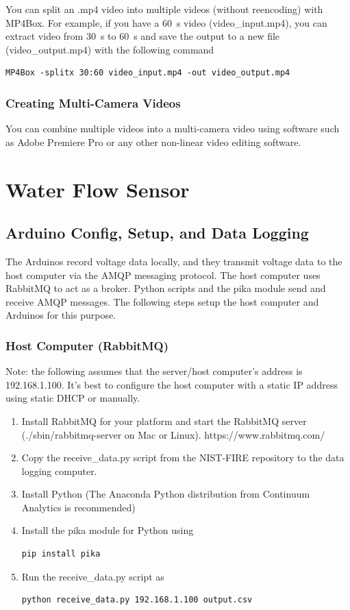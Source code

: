 \documentclass[11pt,oneside]{book}
\begin{document}
You can split an .mp4 video into multiple videos (without reencoding) with MP4Box. For example, if you have a 60~s video (video\_input.mp4), you can extract video from 30~s to 60~s and save the output to a new file (video\_output.mp4) with the following command

\begin{verbatim}
MP4Box -splitx 30:60 video_input.mp4 -out video_output.mp4
\end{verbatim}

\subsection{Creating Multi-Camera Videos}

You can combine multiple videos into a multi-camera video using software such as Adobe Premiere Pro or any other non-linear video editing software.


\chapter{Water Flow Sensor}
\label{chap:Water_Flow_Sensor}

\section{Arduino Config, Setup, and Data Logging}

The Arduinos record voltage data locally, and they transmit voltage data to the host computer via the AMQP messaging protocol. The host computer uses RabbitMQ to act as a broker. Python scripts and the pika module send and receive AMQP messages. The following steps setup the host computer and Arduinos for this purpose.

\subsection{Host Computer (RabbitMQ)}

Note: the following assumes that the server/host computer's address is 192.168.1.100. It's best to configure the host computer with a static IP address using static DHCP or manually.

\begin{enumerate}
\item Install RabbitMQ for your platform and start the RabbitMQ server (./sbin/rabbitmq-server on Mac or Linux).
https://www.rabbitmq.com/
\item Copy the receive\_data.py script from the NIST-FIRE repository to the data logging computer.
\item Install Python (The Anaconda Python distribution from Continuum Analytics is recommended)
\item Install the pika module for Python using
\begin{verbatim}
pip install pika
\end{verbatim}
\item Run the receive\_data.py script as
\begin{verbatim}
python receive_data.py 192.168.1.100 output.csv
\end{verbatim}
\end{enumerate}
\end{document}
